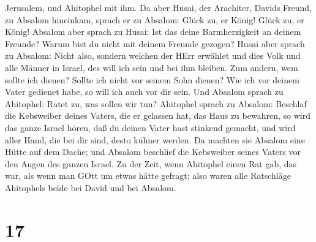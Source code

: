 Jerusalem, und Ahitophel mit ihm.  Da aber Husai, der
Arachiter, Davids Freund, zu Absalom hineinkam, sprach er zu Absalom:
Glück zu, er König! Glück zu, er König!  Absalom aber
sprach zu Husai: Ist das deine Barmherzigkeit an deinem Freunde? Warum
bist du nicht mit deinem Freunde gezogen?  Husai aber
sprach zu Absalom: Nicht also, sondern welchen der HErr erwählet und
dies Volk und alle Männer in Israel, des will ich sein und bei ihm
bleiben.  Zum andern, wem sollte ich dienen? Sollte ich
nicht vor seinem Sohn dienen? Wie ich vor deinem Vater gedienet habe, so
will ich auch vor dir sein.  Und Absalom sprach zu
Ahitophel: Ratet zu, was sollen wir tun?  Ahitophel sprach
zu Absalom: Beschlaf die Kebsweiber deines Vaters, die er gelassen hat,
das Haus zu bewahren, so wird das ganze Israel hören, daß du deinen
Vater hast stinkend gemacht, und wird aller Hand, die bei dir sind,
desto kühner werden.  Da machten sie Absalom eine Hütte auf
dem Dache; und Absalom beschlief die Kebsweiber seines Vaters vor den
Augen des ganzen Israel.  Zu der Zeit, wenn Ahitophel einen
Rat gab, das war, als wenn man GOtt um etwas hätte gefragt; also waren
alle Ratschläge Ahitophels beide bei David und bei Absalom.

\hypertarget{section-16}{%
\section{17}\label{section-16}}

